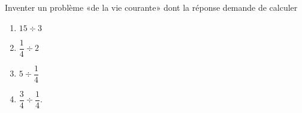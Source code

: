 
\begin{exercice}\label{exo2smath-0035}

    Inventer un problème «de la vie courante» dont la réponse demande de calculer
    \begin{multicols}{2}
    \begin{enumerate}
        \item
            \( 15\div 3\)
        \item
            \( \dfrac{ 1 }{ 4 }\div 2\)
        \item
            \(  5\div \dfrac{ 1 }{ 4 } \)
        \item
            \( \dfrac{ 3 }{ 4 }\div\dfrac{ 1 }{ 4 }\).
    \end{enumerate}
    \end{multicols}

\end{exercice}
